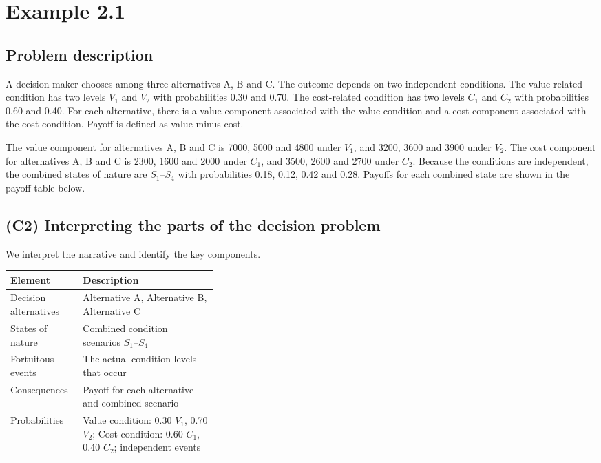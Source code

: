 \section{Example 2.1}\label{sec:example2-1}

\subsection{Problem description}\label{subsec:example2-1-problem}

A decision maker chooses among three alternatives A, B and C. The outcome depends on two independent conditions. The value-related condition has two levels \(V_1\) and \(V_2\) with probabilities 0.30 and 0.70. The cost-related condition has two levels \(C_1\) and \(C_2\) with probabilities 0.60 and 0.40. For each alternative, there is a value component associated with the value condition and a cost component associated with the cost condition. Payoff is defined as value minus cost.

The value component for alternatives A, B and C is 7000, 5000 and 4800 under \(V_1\), and 3200, 3600 and 3900 under \(V_2\). The cost component for alternatives A, B and C is 2300, 1600 and 2000 under \(C_1\), and 3500, 2600 and 2700 under \(C_2\). Because the conditions are independent, the combined states of nature are \(S_1\)--\(S_4\) with probabilities 0.18, 0.12, 0.42 and 0.28. Payoffs for each combined state are shown in the payoff table below.


\subsection{(C2) Interpreting the parts of the decision problem}\label{subsubsec:example2-1-c2}

We interpret the narrative and identify the key components.

\begin{center}
	\begin{tabularx}{\linewidth}{@{}L{0.35\linewidth}Y@{}}
		\toprule
		Element & Description \\
		\midrule
		Decision alternatives & Alternative A, Alternative B, Alternative C \\
		States of nature & Combined condition scenarios \(S_1\)--\(S_4\) \\
		Fortuitous events & The actual condition levels that occur \\
		Consequences & Payoff for each alternative and combined scenario \\
		Probabilities & Value condition: 0.30 \(V_1\), 0.70 \(V_2\); Cost condition: 0.60 \(C_1\), 0.40 \(C_2\); independent events \\
		\bottomrule
	\end{tabularx}
\end{center}


